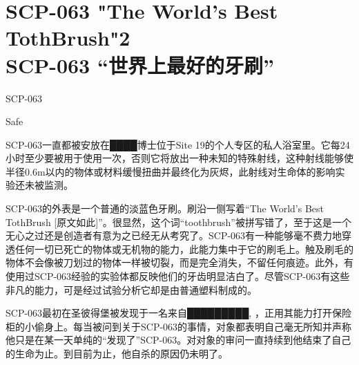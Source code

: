 \chapter[SCP-063 “世界上最好的牙刷”]{
    SCP-063 "The World's Best TothBrush"2\\
    SCP-063 “世界上最好的牙刷”
}

\label{chap:SCP-063}

SCP-063

Safe

SCP-063一直都被安放在████博士位于Site 19的个人专区的私人浴室里。它每24小时至少要被用于使用一次，否则它将放出一种未知的特殊射线，这种射线能够使半径0.6m以内的物体或材料缓慢扭曲并最终化为灰烬，此射线对生命体的影响实验还未被监测。

SCP-063的外表是一个普通的淡蓝色牙刷。刷沿一侧写着“The World's Best TothBrush {[}原文如此]”。很显然，这个词“toothbrush”被拼写错了，至于这是一个无心之过还是创造者有意为之已经无从考究了。SCP-063有一种能够毫不费力地穿透任何一切已死亡的物体或无机物的能力，此能力集中于它的刷毛上。触及刷毛的物体不会像被刀划过的物体一样被切裂，而是完全消失，不留任何痕迹。此外，有使用过SCP-063经验的实验体都反映他们的牙齿明显洁白了。尽管SCP-063有这些非凡的能力，可是经过试验分析它却是由普通塑料制成的。

SCP-063最初在圣彼得堡被发现于一名来自█████████, ，正用其能力打开保险柜的小偷身上。每当被问到关于SCP-063的事情，对象都表明自己毫无所知并声称他只是在某一天单纯的“发现了”SCP-063。对对象的审问一直持续到他结束了自己的生命为止。到目前为止，他自杀的原因仍未明了。
